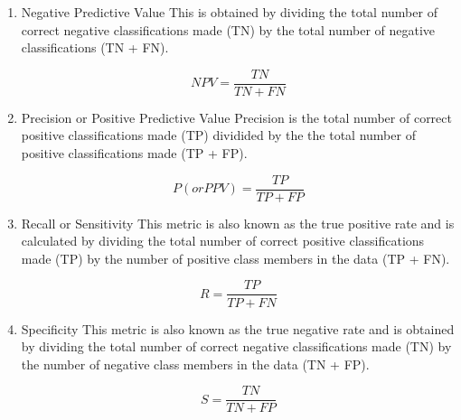 \begin{enumerate}
    \item{Negative Predictive Value}\newline
    This is obtained by dividing the total number of correct negative classifications made (TN) by the total number of negative classifications (TN + FN).
    
    \begin{equation}
        NPV = \frac{TN}{TN+FN}
    \end{equation}
    
    \item{Precision or Positive Predictive Value}\newline
    Precision is the total number of correct positive classifications made (TP) dividided by the the total number of positive classifications made (TP + FP).
    
    \begin{equation}
        P (or PPV) = \frac{TP}{TP + FP}
    \end{equation}
    
    \item{Recall or Sensitivity}\newline
    This metric is also known as the true positive rate and is calculated by dividing the total number of correct positive classifications made (TP) by the number of positive class members in the data (TP + FN).
    
    \begin{equation}
        R = \frac{TP}{TP+FN}
    \end{equation}
    
    \item{Specificity}\newline
    This metric is also known as the true negative rate and is obtained by dividing the total number of correct negative classifications made (TN) by the number of negative class members in the data (TN + FP).
    
    \begin{equation}
        S = \frac{TN}{TN+FP}
    \end{equation}
    
\end{enumerate}

